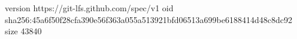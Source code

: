 version https://git-lfs.github.com/spec/v1
oid sha256:45a6f50f28cfa390e56f363a055a513921bfd06513a699be6188414d48c8dc92
size 43840
